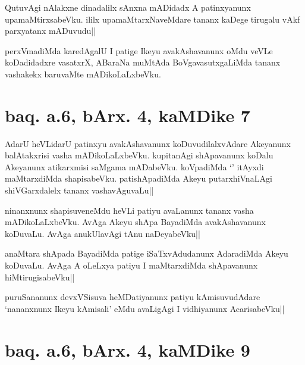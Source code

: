 
\begin{artha}
QutuvAgi nAlakxne dinadalilx sAnxna mADidadx A patinxyanunx 
upamaMtirxsabeVku. ililx upamaMtarxNaveMdare tananx kaDege tirugalu 
vAkf parxyatanx mADuvudu||
\end{artha}

\begin{artha}
perxVmadiMda karedAgalU I patige Ikeyu avakAshavanunx oMdu veVLe 
koDadidadxre vasatxrX, ABaraNa muMtAda BoVgavasutxgaLiMda tananx 
vashakekx baruvaMte mADikoLaLxbeVku.
\end{artha}

\section*{baq. a.6, bArx. 4, kaMDike 7}

\stext

\begin{artha}
AdarU heVLidarU patinxyu avakAshavanunx koDuvudilalxvAdare Akeyanunx 
balAtakxrisi vasha mADikoLaLxbeVku. kupitanAgi shApavanunx koDalu 
Akeyanunx atikarxmisi saMgama mADabeVku. koVpadiMda `\stext' itAyxdi 
maMtarxdiMda shapisabeVku. patishApadiMda Akeyu putarxhiVnaLAgi 
shiVGarxdalelx tananx vashavAguvaLu||
\end{artha}

\begin{artha}
ninanxnunx shapisuveneMdu heVLi patiyu avaLanunx tananx vasha 
mADikoLaLxbeVku. AvAga Akeyu shApa BayadiMda avakAshavanunx koDuvaLu. 
AvAga anukUlavAgi tAnu naDeyabeVku||
\end{artha}


\begin{artha}
anaMtara shApada BayadiMda patige iSaTxvAdudanunx AdaradiMda Akeyu 
koDuvaLu. AvAga A oLeLxya patiyu I maMtarxdiMda shApavanunx 
hiMtirugisabeVku||
\end{artha}


\begin{artha}
puruSananunx devxVSisuva heMDatiyanunx patiyu kAmisuvudAdare 
`nananxnunx Ikeyu kAmisali' eMdu avaLigAgi I vidhiyanunx AcarisabeVku||
\end{artha}

\section*{baq. a.6, bArx. 4, kaMDike 9}

